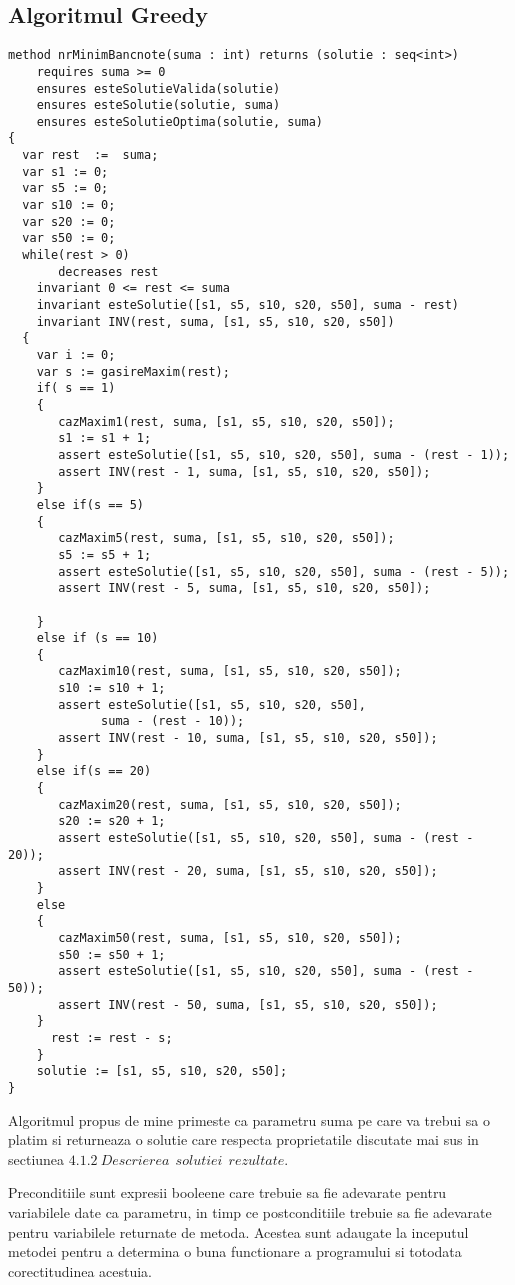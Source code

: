 \subsection{Algoritmul Greedy}
\begin{lstlisting}
method nrMinimBancnote(suma : int) returns (solutie : seq<int>)
	requires suma >= 0
	ensures esteSolutieValida(solutie)
	ensures esteSolutie(solutie, suma)
	ensures esteSolutieOptima(solutie, suma)
{
  var rest  :=  suma;
  var s1 := 0;
  var s5 := 0;
  var s10 := 0;
  var s20 := 0;
  var s50 := 0;
  while(rest > 0)
  	   decreases rest
   	invariant 0 <= rest <= suma
   	invariant esteSolutie([s1, s5, s10, s20, s50], suma - rest)
   	invariant INV(rest, suma, [s1, s5, s10, s20, s50])
  {
 	var i := 0;
	var s := gasireMaxim(rest);
	if( s == 1)
	{
	   cazMaxim1(rest, suma, [s1, s5, s10, s20, s50]);
	   s1 := s1 + 1;
	   assert esteSolutie([s1, s5, s10, s20, s50], suma - (rest - 1));
	   assert INV(rest - 1, suma, [s1, s5, s10, s20, s50]);
	}
	else if(s == 5)
	{
	   cazMaxim5(rest, suma, [s1, s5, s10, s20, s50]);
	   s5 := s5 + 1;
	   assert esteSolutie([s1, s5, s10, s20, s50], suma - (rest - 5));
	   assert INV(rest - 5, suma, [s1, s5, s10, s20, s50]);
			
	}
	else if (s == 10)
	{
	   cazMaxim10(rest, suma, [s1, s5, s10, s20, s50]);
	   s10 := s10 + 1;
	   assert esteSolutie([s1, s5, s10, s20, s50],
	   		 suma - (rest - 10));
	   assert INV(rest - 10, suma, [s1, s5, s10, s20, s50]);	
	}
	else if(s == 20)
	{
	   cazMaxim20(rest, suma, [s1, s5, s10, s20, s50]);
	   s20 := s20 + 1;
	   assert esteSolutie([s1, s5, s10, s20, s50], suma - (rest - 20));
       assert INV(rest - 20, suma, [s1, s5, s10, s20, s50]);
	}
	else
	{
	   cazMaxim50(rest, suma, [s1, s5, s10, s20, s50]);
	   s50 := s50 + 1;
	   assert esteSolutie([s1, s5, s10, s20, s50], suma - (rest - 50));
	   assert INV(rest - 50, suma, [s1, s5, s10, s20, s50]);
	}
	  rest := rest - s;
	}
	solutie := [s1, s5, s10, s20, s50];
}
\end{lstlisting}
\par 
Algoritmul propus de mine primeste ca parametru suma pe care va trebui sa o platim si returneaza o solutie care respecta proprietatile discutate mai sus in sectiunea $4.1.2 \ Descrierea \ \ solutiei \ \ rezultate $.
\par 
Preconditiile sunt expresii booleene care trebuie sa fie adevarate pentru variabilele date ca parametru, in timp ce postconditiile trebuie sa fie adevarate pentru variabilele returnate de metoda. Acestea sunt adaugate la inceputul metodei pentru a determina o buna functionare a programului si totodata corectitudinea acestuia.
